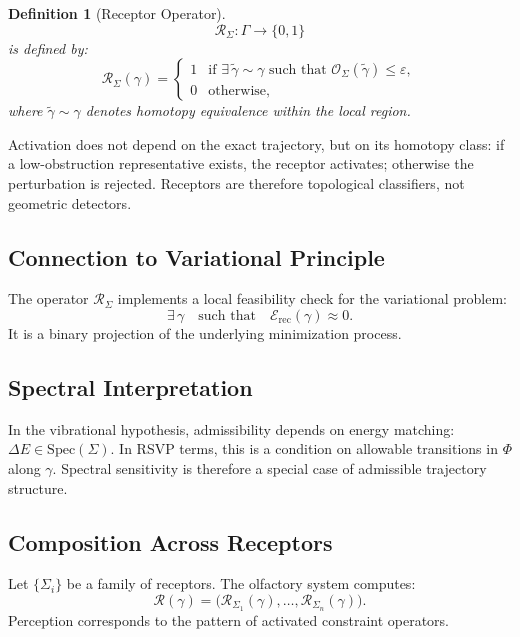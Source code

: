 \documentclass[12pt,a4paper]{article}
\newtheorem{definition}[theorem]{Definition}
\begin{document}
\begin{definition}[Receptor Operator]
\[
\mathcal{R}_\Sigma : \Gamma \to \{0,1\}
\]
is defined by:
\[
\mathcal{R}_\Sigma(\gamma) =
\begin{cases}
1 & \text{if } \exists\,\tilde{\gamma} \sim \gamma \text{ such that } \mathcal{O}_\Sigma(\tilde{\gamma}) \leq \varepsilon, \\
0 & \text{otherwise,}
\end{cases}
\]
where $\tilde{\gamma} \sim \gamma$ denotes homotopy equivalence within the local region.
\end{definition}

Activation does not depend on the exact trajectory, but on its homotopy class: if a low-obstruction representative exists, the receptor activates; otherwise the perturbation is rejected. Receptors are therefore topological classifiers, not geometric detectors.

\subsection{Connection to Variational Principle}

The operator $\mathcal{R}_\Sigma$ implements a local feasibility check for the variational problem:
\[
\exists\,\gamma \quad \text{such that} \quad \mathcal{E}_{\text{rec}}(\gamma) \approx 0.
\]
It is a binary projection of the underlying minimization process.

\subsection{Spectral Interpretation}

In the vibrational hypothesis, admissibility depends on energy matching: $\Delta E \in \mathrm{Spec}(\Sigma)$. In RSVP terms, this is a condition on allowable transitions in $\Phi$ along $\gamma$. Spectral sensitivity is therefore a special case of admissible trajectory structure.

\subsection{Composition Across Receptors}

Let $\{\Sigma_i\}$ be a family of receptors. The olfactory system computes:
\[
\mathcal{R}(\gamma) = \bigl(\mathcal{R}_{\Sigma_1}(\gamma), \dots, \mathcal{R}_{\Sigma_n}(\gamma)\bigr).
\]
Perception corresponds to the pattern of activated constraint operators.
\end{document}
